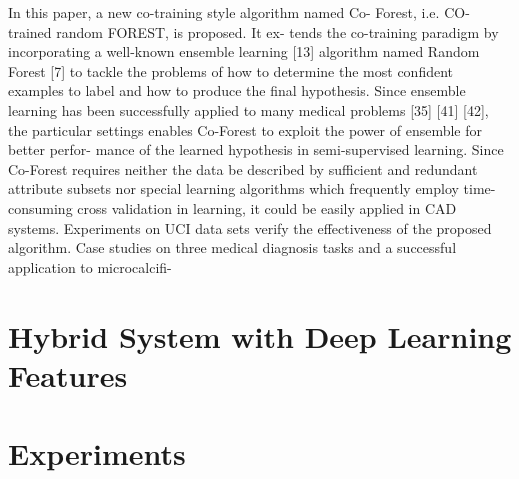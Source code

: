 \documentclass[journal]{IEEEtran}
\begin{document}
In this paper, a new co-training style algorithm named Co- Forest, i.e. CO-trained random FOREST, is proposed. It ex- tends the co-training paradigm by incorporating a well-known ensemble learning [13] algorithm named Random Forest [7] to tackle the problems of how to determine the most confident examples to label and how to produce the final hypothesis. Since ensemble learning has been successfully applied to many medical problems [35] [41] [42], the particular settings enables Co-Forest to exploit the power of ensemble for better perfor- mance of the learned hypothesis in semi-supervised learning. Since Co-Forest requires neither the data be described by sufficient and redundant attribute subsets nor special learning algorithms which frequently employ time-consuming cross validation in learning, it could be easily applied in CAD systems. Experiments on UCI data sets verify the effectiveness of the proposed algorithm. Case studies on three medical diagnosis tasks and a successful application to microcalcifi-\section{Hybrid System with Deep Learning Features}



\section{Experiments}
\end{document}
